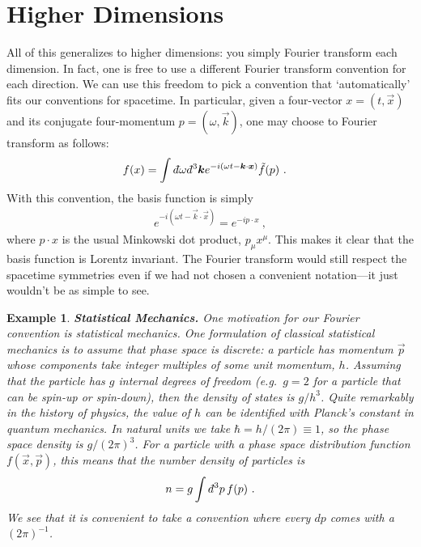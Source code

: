 \documentclass[
  11pt,
	colorful,
	raggedright,
]{tufte-style-thesis-flip}
\newtheorem{example}{Example}[section]
\renewcommand{\dbar}{d\hspace*{-0.08em}\bar{}\hspace*{0.1em}}
\begin{document}
\section{Higher Dimensions}

All of this generalizes to higher dimensions: you simply Fourier transform each dimension. In fact, one is free to use a different Fourier transform convention for each direction. We can use this freedom to pick a convention that `automatically' fits our conventions for spacetime. In particular, given a four-vector $x=(t,\vec{x})$ and its conjugate four-momentum $p=(\omega, \vec{k})$, one may choose to Fourier transform as follows: 
\begin{align}
  f(x) &= \int \dbar\omega\dbar^3\vec{k} e^{-i(\omega t-\vec{k}\cdot\vec{x})} \tilde f(p)
  \ .
\end{align}
With this convention, the basis function is simply
\begin{align}
  e^{-i(\omega t-\vec{k}\cdot\vec{x})} 
  = e^{-ip\cdot x} \ , 
\end{align}
where $p\cdot x$ is the usual Minkowski dot product, $p_\mu x^\mu$. This makes it clear that the basis function is Lorentz invariant. The Fourier transform would still respect the spacetime symmetries even if we had not chosen a convenient notation---it just wouldn't be as simple to see.

\begin{example}
\textbf{Statistical Mechanics.} One motivation for our Fourier convention is statistical mechanics. One formulation of classical statistical mechanics is to assume that phase space is discrete: a particle has momentum $\vec{p}$ whose components take integer multiples of some unit momentum, $h$. Assuming that the particle has $g$ internal degrees of freedom (e.g.~$g=2$ for a particle that can be spin-up or spin-down), then the density of states is $g/h^{3}$. Quite remarkably in the history of physics, the value of $h$ can be identified with Planck's constant in quantum mechanics. In natural units we take $\hbar = h/(2\pi)\equiv 1$, so the phase space density is $g/(2\pi)^3$. For a particle with a phase space distribution function $f(\vec{x},\vec{p})$, this means that the number density of particles is
\begin{align}
  n = g\int \dbar^3p \, f(p) \ .
\end{align}
We see that it is convenient to take a convention where every $dp$ comes with a $(2\pi)^{-1}$.
\end{example}
\end{document}
